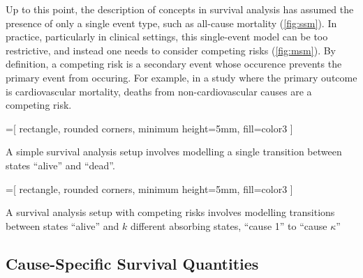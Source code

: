 Up to this point, the description of concepts in survival analysis has
assumed the presence of only a single event type, such as all-cause mortality
(\cref{fig:ssm}).
In practice, particularly in clinical settings, 
this single-event model can be too restrictive,
and instead one needs to consider competing risks
(\cref{fig:msm}).
By definition, a competing risk is a secondary event whose occurence 
prevents the primary event from occuring.
For example,
in a study where the primary outcome is cardiovascular mortality,
deaths from non-cardiovascular causes are a competing risk.

\begin{marginfigure}[-10em]%
    =[%
        rectangle, rounded corners, minimum height=5mm, fill=color3
    ]
    \centering
    \caption[A Single State Survival Model]{
        A simple survival analysis setup 
        involves modelling a single transition between states 
        \enquote{alive} and \enquote{dead}.
    }
    \label{fig:ssm}
\end{marginfigure}%

\begin{marginfigure}[0em]%
    =[%
        rectangle, rounded corners, minimum height=5mm, fill=color3
    ]
    \centering
    \caption[A Multi-State Model]{
        A survival analysis setup with competing risks
        involves modelling transitions between states 
        \enquote{alive} and \(k\) different absorbing
        states, \enquote{cause 1} to \enquote{cause \(\kappa\)}
    }
    \label{fig:msm}
\end{marginfigure}%

\subsection{Cause-Specific Survival Quantities}

